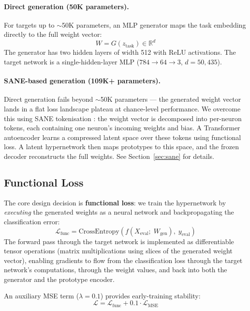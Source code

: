 \documentclass[11pt,a4paper]{article}
\begin{document}
\paragraph{Direct generation (50K parameters).}
For targets up to $\sim$50K parameters, an MLP generator maps the task embedding directly to the full weight vector:
\begin{equation}
    W = G(z_{\text{task}}) \in \mathbb{R}^{d}
\end{equation}
The generator has two hidden layers of width 512 with ReLU activations. The target network is a single-hidden-layer MLP ($784 \to 64 \to 3$, $d = 50{,}435$).

\paragraph{SANE-based generation (109K+ parameters).}
Direct generation fails beyond $\sim$50K parameters --- the generated weight vector lands in a flat loss landscape plateau at chance-level performance. We overcome this using SANE tokenisation \cite{schurholt2024towards}: the weight vector is decomposed into per-neuron tokens, each containing one neuron's incoming weights and bias. A Transformer autoencoder learns a compressed latent space over these tokens using functional loss. A latent hypernetwork then maps prototypes to this space, and the frozen decoder reconstructs the full weights. See Section~\ref{sec:sane} for details.

\subsection{Functional Loss}
\label{sec:functional_loss}

The core design decision is \textbf{functional loss}: we train the hypernetwork by \emph{executing} the generated weights as a neural network and backpropagating the classification error:
\begin{equation}
    \mathcal{L}_{\text{func}} = \text{CrossEntropy}\!\left(f(X_{\text{eval}};\; W_{\text{gen}}),\; y_{\text{eval}}\right)
\end{equation}
The forward pass through the target network is implemented as differentiable tensor operations (matrix multiplications using slices of the generated weight vector), enabling gradients to flow from the classification loss through the target network's computations, through the weight values, and back into both the generator and the prototype encoder.

An auxiliary MSE term ($\lambda = 0.1$) provides early-training stability:
\begin{equation}
    \mathcal{L} = \mathcal{L}_{\text{func}} + 0.1 \cdot \mathcal{L}_{\text{MSE}}
\end{equation}
\end{document}

